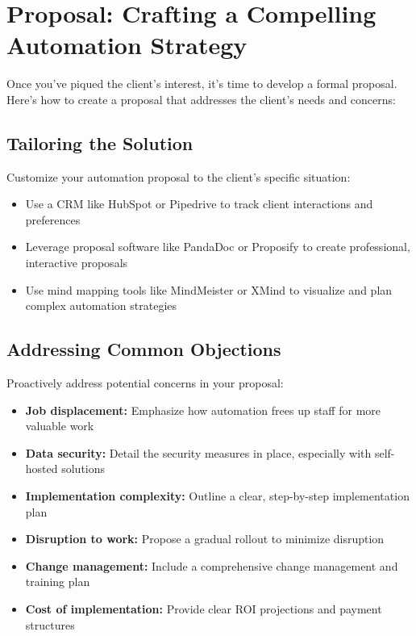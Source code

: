 \section{Proposal: Crafting a Compelling Automation Strategy}

Once you've piqued the client's interest, it's time to develop a formal proposal. Here's how to create a proposal that addresses the client's needs and concerns:

\subsection{Tailoring the Solution}

Customize your automation proposal to the client's specific situation:

\begin{itemize}
    \item Use a CRM like HubSpot or Pipedrive to track client interactions and preferences
    \item Leverage proposal software like PandaDoc or Proposify to create professional, interactive proposals
    \item Use mind mapping tools like MindMeister or XMind to visualize and plan complex automation strategies
\end{itemize}

\subsection{Addressing Common Objections}

Proactively address potential concerns in your proposal:

\begin{itemize}
    \item \textbf{Job displacement:} Emphasize how automation frees up staff for more valuable work
    \item \textbf{Data security:} Detail the security measures in place, especially with self-hosted solutions
    \item \textbf{Implementation complexity:} Outline a clear, step-by-step implementation plan
    \item \textbf{Disruption to work:} Propose a gradual rollout to minimize disruption
    \item \textbf{Change management:} Include a comprehensive change management and training plan
    \item \textbf{Cost of implementation:} Provide clear ROI projections and payment structures
\end{itemize}

